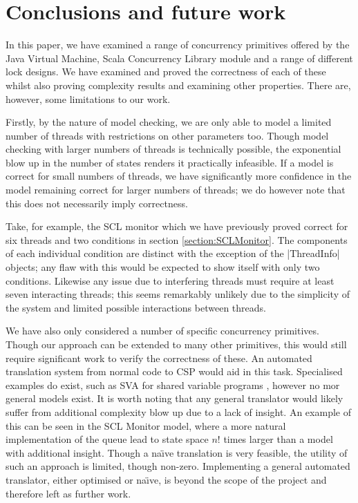 \section{Conclusions and future work}

In this paper, we have examined a range of concurrency primitives offered by the Java Virtual Machine, Scala Concurrency Library module and a range of different lock designs. We have examined and proved the correctness of each of these whilst also proving complexity results and examining other properties. There are, however, some limitations to our work. 

Firstly, by the nature of model checking, we are only able to model a limited number of threads with restrictions on other parameters too. Though model checking with larger numbers of threads is technically possible, the exponential blow up in the number of states renders it practically infeasible. If a model is correct for small numbers of threads, we have significantly more confidence in the model remaining correct for larger numbers of threads; we do however note that this does not necessarily imply correctness. 

Take, for example, the SCL monitor which we have previously proved correct for six threads and two conditions in section \ref{section:SCLMonitor}. The components of each individual condition are distinct with the exception of the |ThreadInfo| objects; any flaw with this would be expected to show itself with only two conditions. Likewise any issue due to interfering threads must require at least seven interacting threads; this seems remarkably unlikely due to the simplicity of the system and limited possible interactions between threads. 

We have also only considered a number of specific concurrency primitives. Though our approach can be extended to many other primitives, this would still require significant work to verify the correctness of these. An automated translation system from normal code to CSP would aid in this task. Specialised examples do exist, such as SVA for shared variable programs \cite{RoscoeSVA}, however no mor general models exist. It is worth noting that any general translator would likely suffer from additional complexity blow up due to a lack of insight. An example of this can be seen in the SCL Monitor model, where a more natural implementation of the queue lead to state space $n!$ times larger than a model with additional insight. Though a na\"{\i}ve translation is very feasible, the utility of such an approach is limited, though non-zero. Implementing a general automated translator, either optimised or na\"{\i}ve, is beyond the scope of the project and therefore left as further work. 